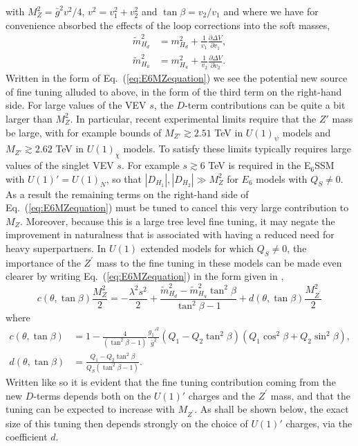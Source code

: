 \documentclass[preprint,amsmath,amssymb,aps,superscriptaddress,prd,showpacs,floatfix,nofootinbib]{revtex4-1}
\begin{document}
with $M_Z^2=\bar{g}^2v^2/4$, $v^2=v_1^2+v_2^2$ and $\tan\beta =
v_2/v_1$ and where we have for convenience absorbed the effects of the
loop corrections into the soft masses,
\begin{align*}
\tilde{m}_{H_d}^2&=m_{H_d}^2+\frac{1}{v_1}\frac{\partial \Delta
  V}{\partial
  v_1},\\ \tilde{m}_{H_u}^2&=m_{H_u}^2+\frac{1}{v_2}\frac{\partial
  \Delta V}{\partial v_2}.
\end{align*}
Written in the form of Eq.~(\ref{eq:E6MZequation}) we see the
potential new source of fine tuning alluded to above, in the form of
the third term on the right-hand side. For large values of the VEV
$s$, the $D$-term contributions can be quite a bit larger than
$M_Z^2$. In particular, recent experimental limits \cite{Aad:2014cka}
require that the $Z'$ mass be large, with for example bounds of
$M_{Z'}\gtrsim 2.51$ TeV in $U(1)_\psi$ models and $M_{Z'}\gtrsim
2.62$ TeV in $U(1)_\chi$ models. To satisfy these
limits typically requires large values of the singlet VEV $s$. For
example $s\gtrsim 6$ TeV is required in the E$_6$SSM with
$U(1)'=U(1)_N$, so that $|D_{H_1}|,|D_{H_2}|\gg M_Z^2$ for $E_6$
models with $Q_S\neq 0$. As a result the remaining terms on the
right-hand side of Eq.~(\ref{eq:E6MZequation}) must be tuned to cancel
this very large contribution to $M_Z$. Moreover, because this
is a large tree level fine tuning, it may negate the improvement in
naturalness that is associated with having a reduced need for heavy
superpartners. In $U(1)$ extended models for which $Q_S\neq 0$, the
importance of the $Z^\prime$ mass to the fine tuning in these models
can be made even clearer by writing Eq.~(\ref{eq:E6MZequation}) in the
form given in \cite{Athron:2013ipa},
\begin{equation}\label{eq:originalE6MZequation}
c(\theta,\tan\beta)\frac{M_Z^2}{2}=-\frac{\lambda^2 s^2}{2}+\frac{\tilde{m}_{H_d}^2-\tilde{m}_{H_u}^2\tan^2\beta}{\tan^2\beta-1}+d(\theta,\tan\beta)\frac{M_{Z^\prime}^2}{2}
\end{equation}
where 
\begin{align}
c(\theta,\tan\beta)&=1-\frac{4}{\left ( \tan^2\beta-1\right )}\frac{g_1'^2}{\bar{g}^2}\left ( Q_1-Q_2\tan^2\beta \right )\left ( Q_1\cos^2\beta+Q_2\sin^2\beta \right ),\label{eq:cdefn}\\
d(\theta,\tan\beta)&= \frac{Q_1-Q_2\tan^2\beta}{Q_S\left ( \tan^2\beta - 1\right )}.\label{eq:ddefn}
\end{align}
Written like so it is evident that the fine tuning contribution coming
from the new $D$-terms depends both on the $U(1)'$ charges and the
$Z^\prime$ mass, and that the tuning can be expected to increase with
$M_{Z^\prime}$. As shall be shown below, the exact size of this tuning
then depends strongly on the choice of $U(1)'$ charges, via the
coefficient $d$.
\end{document}

